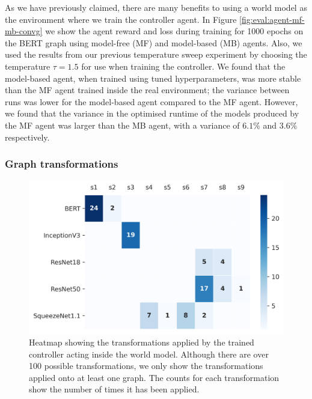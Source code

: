 As we have previously claimed, there are many benefits to using a world model as the environment where we train the controller agent. In Figure \ref{fig:eval:agent-mf-mb-convg} we show the agent reward and loss during training for 1000 epochs on the BERT graph using model-free (MF) and model-based (MB) agents. Also, we used the results from our previous temperature sweep experiment by choosing the temperature $\tau = 1.5$ for use when training the controller. We found that the model-based agent, when trained using tuned hyperparameters, was more stable than the MF agent trained inside the real environment; the variance between runs was lower for the model-based agent compared to the MF agent. However, we found that the variance in the optimised runtime of the models produced by the MF agent was larger than the MB agent, with a variance of $6.1\%$ and $3.6\%$ respectively.


\subsubsection{Graph transformations}

\begin{figure}[ht]
  \centering
  \includegraphics[width=1\columnwidth]{sections/5evaluation/images/xfer_heatmap}
  \caption[Heatmap of graph transformations applied by MB controller]{Heatmap showing the transformations applied by the trained controller acting inside the world model. Although there are over 100 possible transformations, we only show the transformations applied onto at least one graph. The counts for each transformation show the number of times it has been applied.}
  \label{fig:eval:xfer-heatmap}
\end{figure}

